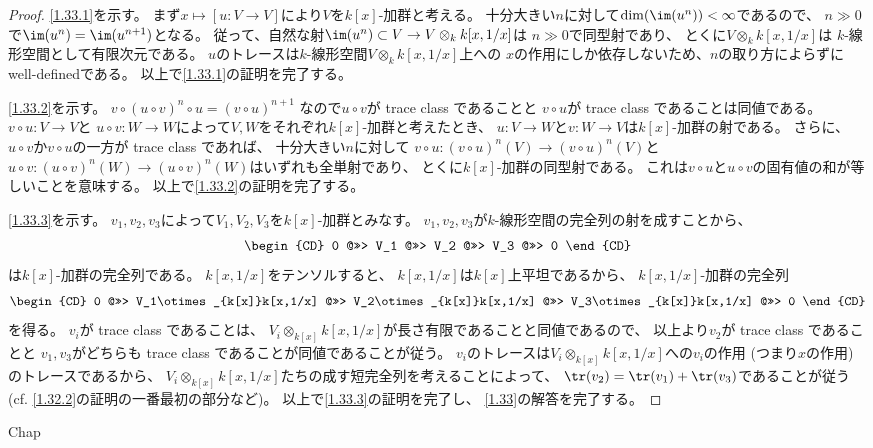 \documentclass[uplatex,dvipdfmx]{jsarticle}
\begin{document}
\begin{proof}
  \ref{1.33.1}を示す。
  まず\(x\mapsto [u:V\to V]\)により\(V\)を\(k[x]\)-加群と考える。
  十分大きい\(n\)に対して\(\dim(\im(u^n)) < \infty\)であるので、
  \(n \gg 0\)で\(\im(u^n) = \im(u^{n+1})\)となる。
  従って、自然な射\(\im(u^n) \subset V\to V\otimes_k k[x,1/x]\)は
  \(n \gg 0\)で同型射であり、
  とくに\(V\otimes_k k[x,1/x]\)は
  \(k\)-線形空間として有限次元である。
  \(u\)のトレースは\(k\)-線形空間\(V\otimes_k k[x,1/x]\)上への
  \(x\)の作用にしか依存しないため、\(n\)の取り方によらずにwell-definedである。
  以上で\ref{1.33.1}の証明を完了する。

  \ref{1.33.2}を示す。
  \(v\circ (u\circ v)^n\circ u = (v\circ u)^{n+1}\)
  なので\(u\circ v\)が trace class であることと
  \(v\circ u\)が trace class であることは同値である。
  \(v\circ u:V\to V\)と
  \(u\circ v:W\to W\)によって\(V,W\)をそれぞれ\(k[x]\)-加群と考えたとき、
  \(u:V\to W\)と\(v:W\to V\)は\(k[x]\)-加群の射である。
  さらに、\(u\circ v\)か\(v\circ u\)の一方が trace class であれば、
  十分大きい\(n\)に対して
  \(v\circ u:(v\circ u)^n (V) \to (v\circ u)^n (V)\)と
  \(u\circ v:(u\circ v)^n (W) \to (u\circ v)^n (W)\)はいずれも全単射であり、
  とくに\(k[x]\)-加群の同型射である。
  これは\(v\circ u\)と\(u\circ v\)の固有値の和が等しいことを意味する。
  以上で\ref{1.33.2}の証明を完了する。

  \ref{1.33.3}を示す。
  \(v_1,v_2,v_3\)によって\(V_1,V_2,V_3\)を\(k[x]\)-加群とみなす。
  \(v_1,v_2,v_3\)が\(k\)-線形空間の完全列の射を成すことから、
  \[
  \begin{CD}
    0 @>>> V_1 @>>> V_2 @>>> V_3 @>>> 0
  \end{CD}
  \]
  は\(k[x]\)-加群の完全列である。
  \(k[x,1/x]\)をテンソルすると、
  \(k[x,1/x]\)は\(k[x]\)上平坦であるから、
  \(k[x,1/x]\)-加群の完全列
  \[
  \begin{CD}
    0 @>>> V_1\otimes_{k[x]}k[x,1/x] @>>> V_2\otimes_{k[x]}k[x,1/x]
    @>>> V_3\otimes_{k[x]}k[x,1/x] @>>> 0
  \end{CD}
  \]
  を得る。
  \(v_i\)が trace class であることは、
  \(V_i\otimes_{k[x]}k[x,1/x]\)が長さ有限であることと同値であるので、
  以上より\(v_2\)が trace class であることと
  \(v_1,v_3\)がどちらも trace class であることが同値であることが従う。
  \(v_i\)のトレースは\(V_i\otimes_{k[x]}k[x,1/x]\)への\(v_i\)の作用
  (つまり\(x\)の作用)
  のトレースであるから、
  \(V_i\otimes_{k[x]}k[x,1/x]\)たちの成す短完全列を考えることによって、
  \(\tr(v_2) = \tr(v_1) + \tr(v_3)\)であることが従う
  (cf. \autoref{1.32.2}の証明の一番最初の部分など)。
  以上で\ref{1.33.3}の証明を完了し、
  \autoref{1.33}の解答を完了する。
\end{proof}



\ifcsname Chap\endcsname\else
\printbibliography
\end{document}
